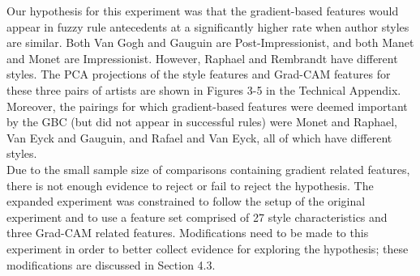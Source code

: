 \documentclass{article}
\begin{document}
\begin{table}[h!]
\centering
{}
\caption{Rules for Raphael vs. Rembrandt}
\label{tab:my-table}
\end{table}

Our hypothesis for this experiment was that the gradient-based features would appear in fuzzy rule antecedents at a significantly higher rate when author styles are similar. Both Van Gogh and Gauguin are Post-Impressionist, and both Manet and Monet are Impressionist. However, Raphael and Rembrandt have different styles. The PCA projections of the style features and Grad-CAM features for these three pairs of artists are shown in Figures 3-5 in the Technical Appendix. Moreover, the pairings for which gradient-based features were deemed important by the GBC (but did not appear in successful rules) were Monet and Raphael, Van Eyck and Gauguin, and Rafael and Van Eyck, all of which have different styles. \\

Due to the small sample size of comparisons containing gradient related features, there is not enough evidence to reject or fail to reject the hypothesis. The expanded experiment was constrained to follow the setup of the original experiment and to use a feature set comprised of 27 style characteristics and three Grad-CAM related features. Modifications need to be made to this experiment in order to better collect evidence for exploring the hypothesis; these modifications are discussed in Section 4.3.
 
\end{document}
